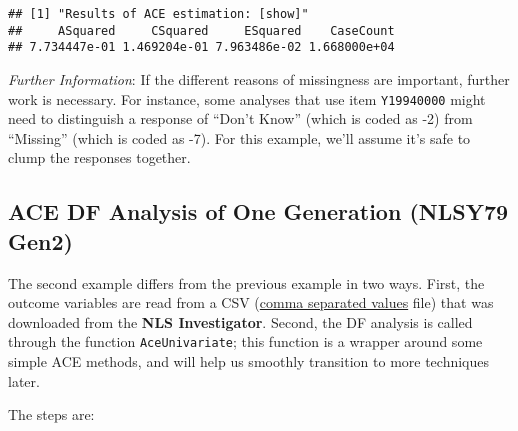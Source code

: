 \documentclass[smallextended]{svjour3}       %
\begin{document}
\begin{verbatim}
## [1] "Results of ACE estimation: [show]"
##     ASquared     CSquared     ESquared    CaseCount 
## 7.734447e-01 1.469204e-01 7.963486e-02 1.668000e+04
\end{verbatim}

\emph{Further Information}: If the different reasons of missingness are
important, further work is necessary. For instance, some analyses that
use item \texttt{Y19940000} might need to distinguish a response of
``Don't Know'' (which is coded as -2) from ``Missing'' (which is coded
as -7). For this example, we'll assume it's safe to clump the responses
together.

\hypertarget{ace-df-analysis-of-one-generation-nlsy79-gen2}{%
\subsection{ACE DF Analysis of One Generation (NLSY79
Gen2)}\label{ace-df-analysis-of-one-generation-nlsy79-gen2}}

The second example differs from the previous example in two ways. First,
the outcome variables are read from a CSV
(\href{http://en.wikipedia.org/wiki/Comma-separated_values}{comma
separated values} file) that was downloaded from the \textbf{NLS
Investigator}. Second, the DF analysis is called through the function
\texttt{AceUnivariate}; this function is a wrapper around some simple
ACE methods, and will help us smoothly transition to more techniques
later.

The steps are:
\end{document}
